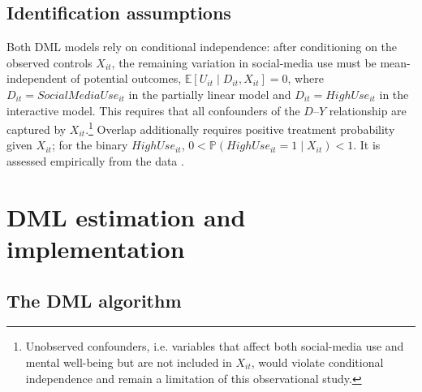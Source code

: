 \documentclass[11pt,oneside,a4paper]{book}
\newcommand{\tocsection}[2]{%
  \section[#1]{#2}%
}
\begin{document}
\subsection[Identification Assumptions]{Identification assumptions}

Both DML models rely on conditional independence: after conditioning on the observed controls \(X_{it}\), the remaining variation in social-media use must be mean-independent of potential outcomes,
\(\mathbb{E}[U_{it}\mid D_{it},X_{it}]=0\),
where \(D_{it}=SocialMediaUse_{it}\) in the partially linear model and \(D_{it}=HighUse_{it}\) in the interactive model. This requires that all confounders of the \(D\)--\(Y\) relationship are captured by \(X_{it}\).\footnote{Unobserved confounders, i.e. variables that affect both social-media use and mental well-being but are not included in \(X_{it}\), would violate conditional independence and remain a limitation of this observational study.} Overlap additionally requires positive treatment probability given \(X_{it}\); for the binary \(HighUse_{it}\), \(0 < \mathbb{P}(HighUse_{it}=1\mid X_{it}) < 1\). It is assessed empirically from the data \citep{chernozhukov2018dml}.

\tocsection{DML Estimation and Implementation}{DML estimation and implementation}

\subsection[The DML Algorithm]{The DML algorithm}
\end{document}
